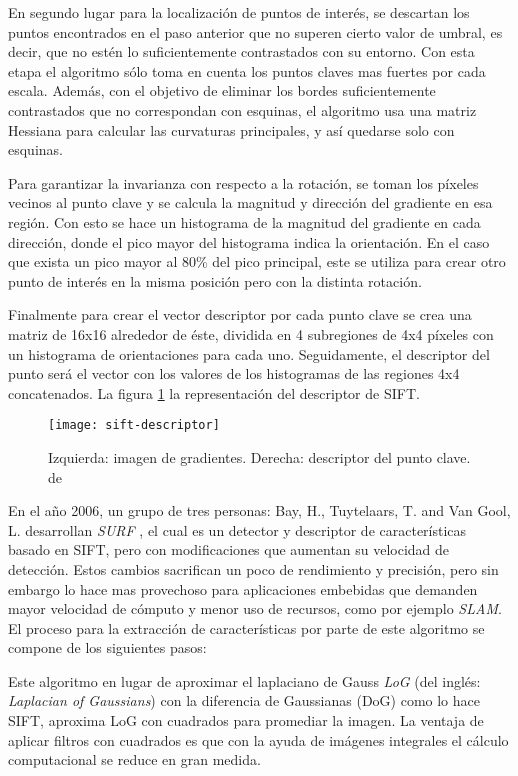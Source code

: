 En segundo lugar para la localización de puntos de interés, se descartan los puntos encontrados en el paso anterior que no superen cierto valor de umbral, es decir, que no estén lo suficientemente contrastados con su entorno. Con esta etapa el algoritmo sólo toma en cuenta los puntos claves mas fuertes por cada escala. Además, con el objetivo de eliminar los bordes suficientemente contrastados que no correspondan con esquinas, el algoritmo usa una matriz Hessiana para calcular las curvaturas principales, y así quedarse solo con esquinas.

Para garantizar la invarianza con respecto a la rotación, se toman los píxeles vecinos al punto clave y se calcula la magnitud y dirección del gradiente en esa región. Con esto se hace un histograma de la magnitud del gradiente en cada dirección, donde el pico mayor del histograma indica la orientación. En el caso que exista un pico mayor al 80\% del pico principal, este se utiliza para crear otro punto de interés en la misma posición pero con la distinta rotación.

Finalmente para crear el vector descriptor por cada punto clave se crea una matriz de 16x16 alrededor de éste, dividida en 4 subregiones de 4x4 píxeles con un histograma de orientaciones para cada uno. Seguidamente, el descriptor del punto será el vector con los valores de los histogramas de las regiones 4x4 concatenados. La figura \ref{imagen:descriptor} la representación del descriptor de SIFT.

\begin{figure}[H]
	\centering
	\texttt{[image: sift-descriptor]}
	\caption[Descriptor SIFT]{Izquierda: imagen de gradientes. Derecha: descriptor del punto clave. de \cite{sift}}
	\label{imagen:descriptor}
\end{figure}


En el año 2006, un grupo de tres personas: Bay, H., Tuytelaars, T. and Van Gool, L. desarrollan \textit{SURF} \cite{surf}, el cual es un detector y descriptor de características basado en SIFT, pero con modificaciones que aumentan su velocidad de detección. Estos cambios sacrifican un poco de rendimiento y precisión, pero sin embargo lo hace mas provechoso para aplicaciones embebidas que demanden mayor velocidad de cómputo y menor uso de recursos, como por ejemplo \textit{SLAM}. El proceso para la extracción de características por parte de este algoritmo se compone de los siguientes pasos:

Este algoritmo en lugar de aproximar el laplaciano de Gauss \textit{LoG} (del inglés: \textit{Laplacian of Gaussians}) con la diferencia de Gaussianas (DoG) como lo hace SIFT, aproxima LoG con cuadrados para promediar la imagen. La ventaja de aplicar filtros con cuadrados es que con la ayuda de imágenes integrales el cálculo computacional se reduce en gran medida.


